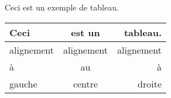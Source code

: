 \documentclass[a4paper]{article}
\begin{document}
Ceci est un exemple de tableau.\\

\begin{tabular}{|l|c|r|}
    \hline
    Ceci       & est un     & tableau.   \\
    \hline
    \hline
    alignement & alignement & alignement \\
    \hline
    à          & au         & à          \\
    \hline
    gauche     & centre     & droite     \\
    \hline
\end{tabular}
\end{document}
